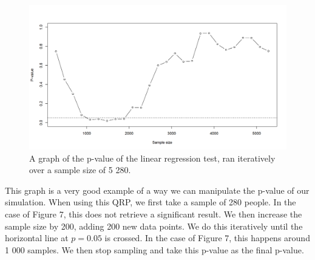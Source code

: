 \documentclass[12pt]{article}
\begin{document}
    \begin{figure}[H]
        \centering
        \includegraphics[width=1\linewidth]{figures/R_graph_pval.png}
        \caption{A graph of the p-value of the linear regression test, ran iteratively over a sample size of 5 280.}
        \label{fig:enter-label}
    \end{figure}

    This graph is a very good example of a way we can manipulate the p-value of our simulation. When using this QRP, we first take a sample of 280 people. In the case of Figure 7, this does not retrieve a significant result. We then increase the sample size by 200, adding 200 new data points. We do this iteratively until the horizontal line at $p=0.05$ is crossed. In the case of Figure 7, this happens around 1 000 samples. We then stop sampling and take this p-value as the final p-value.
\end{document}
